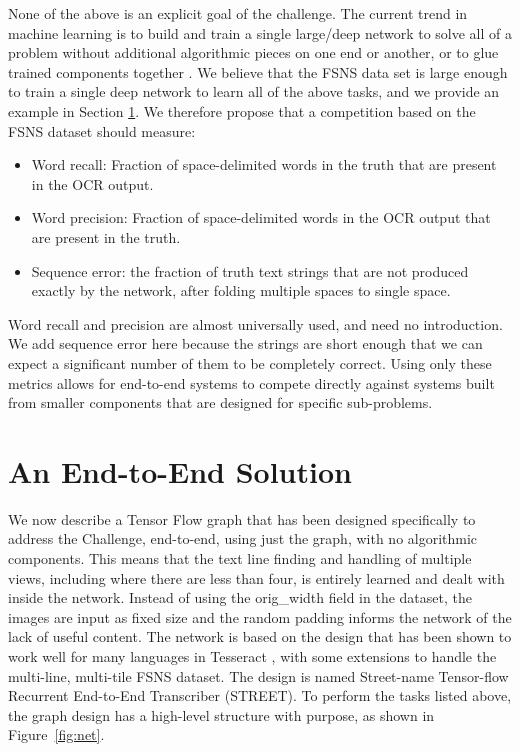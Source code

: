 \documentclass[runningheads]{llncs}
\begin{document}
None of the above is an explicit goal of the challenge. The current trend in machine learning is
 to build and train a single large/deep network to solve all of a problem without additional
 algorithmic pieces on one end or another, or to glue trained components
 together \cite{vinyals2015show}\cite{graves2014towards}. We believe that the FSNS data set is large enough to train
 a single deep network to learn all of the above tasks,
 and we provide an example in Section \ref{baseline}.
 We therefore propose that a competition based on the FSNS dataset should measure:
\begin{itemize}
\setlength\itemsep{0.5em}
\item[\labelitemii] Word recall: Fraction of space-delimited words in the truth that are present in the OCR output.
\item[\labelitemii] Word precision: Fraction of space-delimited words in the OCR output that are present in the truth.
\item[\labelitemii] Sequence error: the fraction of truth text strings that are not produced exactly by
 the network, after folding multiple spaces to single space.
\end{itemize}
Word recall and precision are almost universally used, and need no introduction. We add sequence error
 here because the strings are short enough that we can expect a significant number of them to be
 completely correct. Using only these metrics allows for end-to-end systems to compete directly against
systems built from smaller components that are designed for specific sub-problems.

\section{An End-to-End Solution} \label{baseline}

We now describe a Tensor Flow graph that has been designed specifically to address the Challenge,
 end-to-end, using just the graph, with no algorithmic components. This means that the text line
finding and handling of multiple views, including where there are less than four, is entirely learned
and dealt with inside the network. Instead of using the orig\_width field in the dataset, the images
are input as fixed size and the random padding informs the network of the lack of useful content.
 The network is based on the design that has been shown to work well for many languages in
 Tesseract \cite{tutorial},
 with some extensions to handle the multi-line, multi-tile FSNS dataset.
 The design is named Street-name Tensor-flow Recurrent End-to-End Transcriber (STREET).
 To perform the tasks listed above, the graph design has a high-level structure with purpose,
 as shown in Figure~\ref{fig:net}.
\end{document}
